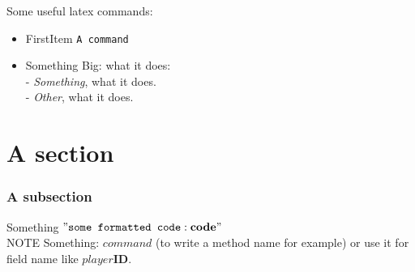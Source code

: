 \documentclass[10pt,english]{article}
\begin{document}
\newpage

Some useful latex commands:\\

\begin{itemize}
\item FirstItem  \texttt{A command}\\


\item Something Big: what it does: \\
- \textit{Something}, what it does.\\
- \textit{Other}, what it does.

\end{itemize}

\section*{A section}

\subsubsection*{A subsection}
Something $"\texttt{some formatted code}:\textbf{code}"$\\

NOTE Something: $command$ (to write a method name for example) or use it for field name like $player\textbf{ID}$. 
\end{document}
